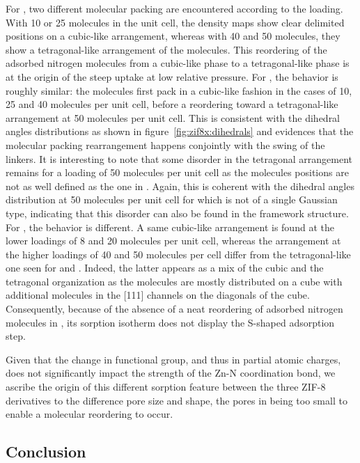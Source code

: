 \documentclass[thesis]{subfiles}
\begin{document}
For , two different molecular packing are encountered according to the
loading. With 10 or 25 molecules in the unit cell, the density maps show clear
delimited positions on a cubic-like arrangement, whereas with 40 and 50
molecules, they show a tetragonal-like arrangement of the molecules. This
reordering of the adsorbed nitrogen molecules from a cubic-like phase to a
tetragonal-like phase is at the origin of the steep uptake at low relative
pressure. For \ZIFCl, the behavior is roughly similar: the molecules first pack
in a cubic-like fashion in the cases of 10, 25 and 40 molecules per unit cell,
before a reordering toward a tetragonal-like arrangement at 50 molecules per
unit cell. This is consistent with the dihedral angles distributions as shown in
figure~\ref{fig:zif8x:dihedrals} and evidences that the molecular packing
rearrangement happens conjointly with the swing of the linkers. It is
interesting to note that some disorder in the tetragonal arrangement remains for
a loading of 50 molecules per unit cell as the molecules positions are not as
well defined as the one in . Again, this is coherent with the dihedral
angles distribution at 50 molecules per unit cell for \ZIFCl which is not of a
single Gaussian type, indicating that this disorder can also be found in the
framework structure. For \ZIFBr, the behavior is different. A same cubic-like
arrangement is found at the lower loadings of 8 and 20 molecules per unit cell,
whereas the arrangement at the higher loadings of 40 and 50 molecules per cell
differ from the tetragonal-like one seen for  and \ZIFCl. Indeed, the
latter appears as a mix of the cubic and the tetragonal organization as the
molecules are mostly distributed on a cube with additional molecules in the
[111] channels on the diagonals of the cube. Consequently, because of the
absence of a neat reordering of adsorbed nitrogen molecules in \ZIFBr, its
sorption isotherm does not display the S-shaped adsorption step.

Given that the change in functional group, and thus in partial atomic charges,
does not significantly impact the strength of the Zn-N coordination bond, we
ascribe the origin of this different sorption feature between the three ZIF-8
derivatives to the difference pore size and shape, the pores in \ZIFBr being
too small to enable a molecular reordering to occur.

\subsection{Conclusion}

\OnlyInSubfile{\printbibliography}
\end{document}

